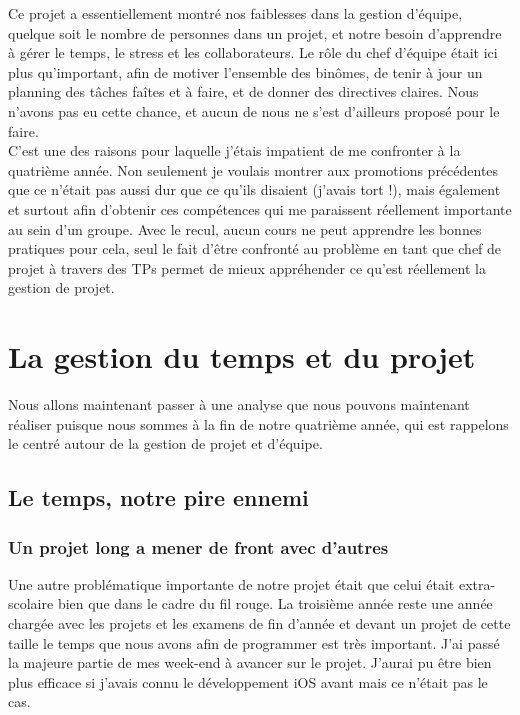 \documentclass{article}
\begin{document}
		Ce projet a essentiellement montré nos faiblesses dans la gestion d'équipe, quelque soit le nombre de personnes dans un projet, et notre besoin d'apprendre à gérer le temps, le stress et les collaborateurs. Le rôle du chef d'équipe était ici plus qu'important, afin de motiver l'ensemble des binômes, de tenir à jour un planning des tâches faîtes et à faire, et de donner des directives claires. Nous n'avons pas eu cette chance, et aucun de nous ne s'est d'ailleurs proposé pour le faire. \\
		
		C'est une des raisons pour laquelle j'étais impatient de me confronter à la quatrième année. Non seulement je voulais montrer aux promotions précédentes que ce n'était pas aussi dur que ce qu'ils disaient (j'avais tort !), mais également et surtout afin d'obtenir ces compétences qui me paraissent réellement importante au sein d'un groupe. Avec le recul, aucun cours ne peut apprendre les bonnes pratiques pour cela, seul le fait d'être confronté au problème en tant que chef de projet à travers des TPs permet de mieux appréhender ce qu'est réellement la gestion de projet.


\section{La gestion du temps et du projet}
		Nous allons maintenant passer à une analyse que nous pouvons maintenant réaliser puisque nous sommes à la fin de notre quatrième année, qui est rappelons le centré autour de la gestion de projet et d'équipe.
		
	\subsection{Le temps, notre pire ennemi}
		\subsubsection{Un projet long a mener de front avec d'autres}
		Une autre problématique importante de notre projet était que celui était extra-scolaire bien que dans le cadre du fil rouge. La troisième année reste une année chargée avec les projets et les examens de fin d'année et devant un projet de cette taille le temps que nous avons afin de programmer est très important. J'ai passé la majeure partie de mes week-end à avancer sur le projet. J'aurai pu être bien plus efficace si j'avais connu le développement iOS avant mais ce n'était pas le cas.
\end{document}

